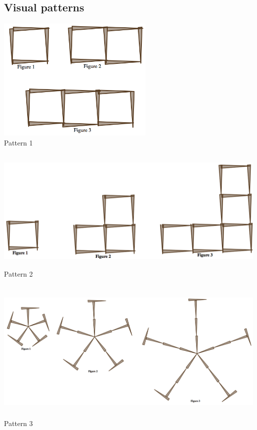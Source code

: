 \bigskip
\bigskip

\subsection*{Visual patterns}

\begin{center}
\includegraphics[height=6cm]{matching1}\\
Pattern 1

\bigskip


\includegraphics[height=6cm]{matching2}\\
Pattern 2


\bigskip

\includegraphics[height=7cm]{matching3}\\
Pattern 3



\end{center}
